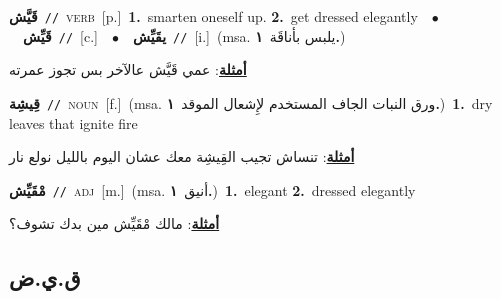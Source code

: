 \documentclass[10pt,a4paper,twoside]{article} %
\begin{document}
\begin{multicols}{2}
{\setlength\topsep{0pt}\textbf{\foreignlanguage{arabic}{قَيَّش}}\ {\color{gray}\texttt{//}\color{black}}\ \textsc{verb}\ [p.]\ \textbf{1.}~smarten oneself up.  \textbf{2.}~get dressed elegantly\ \ $\bullet$\ \ \setlength\topsep{0pt}\textbf{\foreignlanguage{arabic}{قَيِّش}}\ {\color{gray}\texttt{//}\color{black}}\ [c.]\ \ $\bullet$\ \ \setlength\topsep{0pt}\textbf{\foreignlanguage{arabic}{يقَيِّش}}\ {\color{gray}\texttt{//}\color{black}}\ [i.]\ \color{gray}(msa. \foreignlanguage{arabic}{يلبس بأناقَة}~\foreignlanguage{arabic}{\textbf{١.}})\color{black}\  \begin{flushright}\color{gray}\foreignlanguage{arabic}{\textbf{\underline{\foreignlanguage{arabic}{أمثلة}}}: عمي قَيَّش عالآخر بس تجوز عمرته}\end{flushright}\color{black}} \vspace{2mm}

{\setlength\topsep{0pt}\textbf{\foreignlanguage{arabic}{قِيشِة}}\ {\color{gray}\texttt{//}\color{black}}\ \textsc{noun}\ [f.]\ \color{gray}(msa. \foreignlanguage{arabic}{ورق النبات الجاف المستخدم لإِشعال الموقد}~\foreignlanguage{arabic}{\textbf{١.}})\color{black}\ \textbf{1.}~dry leaves that ignite fire\  \begin{flushright}\color{gray}\foreignlanguage{arabic}{\textbf{\underline{\foreignlanguage{arabic}{أمثلة}}}: تنساش تجيب القِيشِة معك عشان اليوم بالليل نولع نار}\end{flushright}\color{black}} \vspace{2mm}

{\setlength\topsep{0pt}\textbf{\foreignlanguage{arabic}{مْقَيِّش}}\ {\color{gray}\texttt{//}\color{black}}\ \textsc{adj}\ [m.]\ \color{gray}(msa. \foreignlanguage{arabic}{أنيق}~\foreignlanguage{arabic}{\textbf{١.}})\color{black}\ \textbf{1.}~elegant  \textbf{2.}~dressed elegantly\  \begin{flushright}\color{gray}\foreignlanguage{arabic}{\textbf{\underline{\foreignlanguage{arabic}{أمثلة}}}: مالك مْقَيِّش مين بدك تشوف؟}\end{flushright}\color{black}} \vspace{2mm}

\vspace{-3mm}
\subsection*{\color{blue}\foreignlanguage{arabic}{ق.ي.ض}\color{blue}{}} 


\end{multicols}
\end{document}
